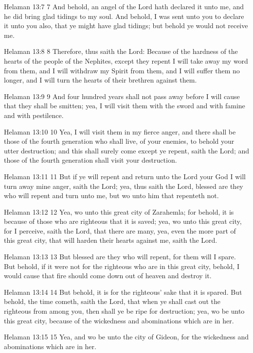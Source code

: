 Helaman 13:7
 7 And behold, an angel of the Lord hath declared it unto me, and
he did bring glad tidings to my soul. And behold, I was sent
unto you to declare it unto you also, that ye might have glad
tidings; but behold ye would not receive me.

Helaman 13:8
 8 Therefore, thus saith the Lord: Because of the hardness of the
hearts of the people of the Nephites, except they repent I will
take away my word from them, and I will withdraw my Spirit from
them, and I will suffer them no longer, and I will turn the
hearts of their brethren against them.

Helaman 13:9
 9 And four hundred years shall not pass away before I will cause
that they shall be smitten; yea, I will visit them with the sword
and with famine and with pestilence.

Helaman 13:10
 10 Yea, I will visit them in my fierce anger, and there shall be
those of the fourth generation who shall live, of your enemies,
to behold your utter destruction; and this shall surely come
except ye repent, saith the Lord; and those of the fourth
generation shall visit your destruction.

Helaman 13:11
 11 But if ye will repent and return unto the Lord your God I
will turn away mine anger, saith the Lord; yea, thus saith the
Lord, blessed are they who will repent and turn unto me, but wo
unto him that repenteth not.

Helaman 13:12
 12 Yea, wo unto this great city of Zarahemla; for behold, it is
because of those who are righteous that it is saved; yea, wo unto
this great city, for I perceive, saith the Lord, that there are
many, yea, even the more part of this great city, that will
harden their hearts against me, saith the Lord.

Helaman 13:13
 13 But blessed are they who will repent, for them will I spare.
But behold, if it were not for the righteous who are in this
great city, behold, I would cause that fire should come down out
of heaven and destroy it.

Helaman 13:14
 14 But behold, it is for the righteous' sake that it is spared.
But behold, the time cometh, saith the Lord, that when ye shall
cast out the righteous from among you, then shall ye be ripe for
destruction; yea, wo be unto this great city, because of the
wickedness and abominations which are in her.

Helaman 13:15
 15 Yea, and wo be unto the city of Gideon, for the wickedness
and abominations which are in her.

